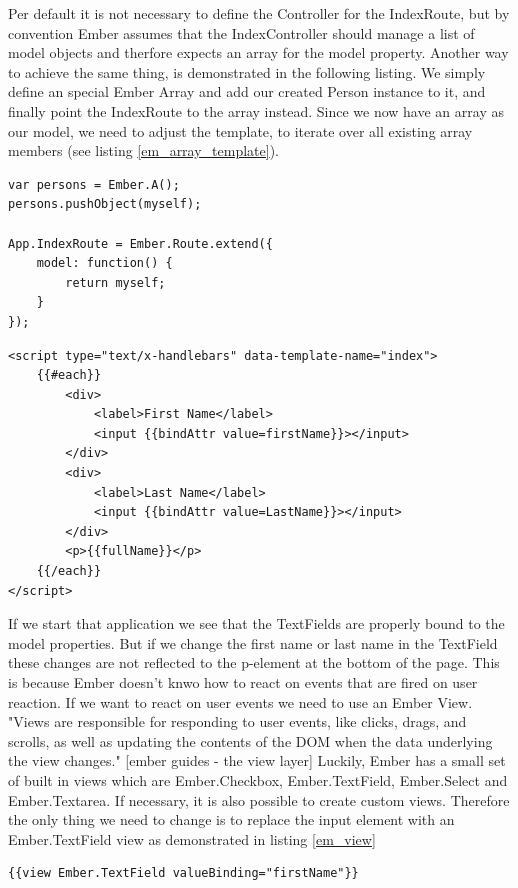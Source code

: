 Per default it is not necessary to define the Controller for the IndexRoute, but by convention Ember assumes that the IndexController should manage a list of model objects and therfore expects an array for the model property. Another way to achieve the same thing, is demonstrated in the following listing. We simply define an special Ember Array and add our created Person instance to it, and finally point the IndexRoute to the array instead. Since we now have an array as our model, we need to adjust the template, to iterate over all existing array members (see listing \ref{em_array_template}).

\begin{lstlisting}[caption=app.js]
var persons = Ember.A();
persons.pushObject(myself);

App.IndexRoute = Ember.Route.extend({
    model: function() {
        return myself;
    }
});

\end{lstlisting}     

\begin{lstlisting}[label=em_array_template,caption=index.html]
<script type="text/x-handlebars" data-template-name="index">
	{{#each}}
		<div>
			<label>First Name</label> 
			<input {{bindAttr value=firstName}}></input>
		</div>
		<div>
			<label>Last Name</label> 
			<input {{bindAttr value=LastName}}></input>
		</div>
		<p>{{fullName}}</p>
	{{/each}}
</script>
\end{lstlisting}

If we start that application we see that the TextFields are properly bound to the model properties. But if we change the first name or last name in the TextField these changes are not reflected to the p-element at the bottom of the page. This is because Ember doesn't knwo how to react on events that are fired on user reaction. If we want to react on user events we need to use an Ember View. "Views are responsible for responding to user events, like clicks, drags, and scrolls, as well as updating the contents of the DOM when the data underlying the view changes." [ember guides - the view layer]
Luckily, Ember has a small set of built in views which are Ember.Checkbox, Ember.TextField, Ember.Select and Ember.Textarea. If necessary, it is also possible to create custom views. Therefore the only thing we need to change is to replace the input element with an Ember.TextField view as demonstrated in listing \ref{em_view}

\begin{lstlisting}[label=em_view,caption=Ember Views]
	{{view Ember.TextField valueBinding="firstName"}}
\end{lstlisting}

